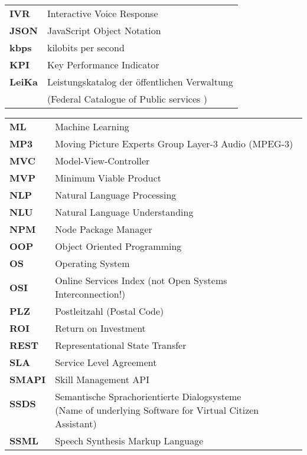 \begin{flushleft}
\begin{tabular}{ll}
\textbf{IVR}	&	Interactive Voice Response\\

\textbf{JSON}	&	JavaScript Object Notation\\

\textbf{kbps}	&	kilobits per second\\

\textbf{KPI}	&	Key Performance Indicator\\

\textbf{LeiKa}	&	Leistungskatalog der öffentlichen Verwaltung \\
& (Federal Catalogue of Public %
services )\\


\end{tabular}
\begin{tabular}{ll}


\textbf{ML}		&	Machine Learning\\
\textbf{MP3}	&	Moving Picture Experts Group Layer-3 Audio (MPEG-3)\\
\textbf{MVC}	&	Model-View-Controller\\
\textbf{MVP}	&	Minimum Viable Product\\



\textbf{NLP}	&	Natural Language Processing\\
\textbf{NLU}	&	Natural Language Understanding\\
\textbf{NPM}	&	Node Package Manager\\

\textbf{OOP}		&	Object Oriented Programming\\
\textbf{OS}		&	Operating System\\
\textbf{OSI}	&	Online Services Index (not Open Systems Interconnection!)\\
\textbf{PLZ}	&	Postleitzahl (Postal Code)\\

\textbf{ROI}	&	Return on Investment\\
\textbf{REST}	&	Representational State Transfer\\
\textbf{SLA}	&	Service Level Agreement\\
\textbf{SMAPI}	&	Skill Management API\\


\shortstack[l]{\textbf{SSDS}\\ \textcolor{white}{x}}	&	\shortstack[l]{Semantische Sprachorientierte Dialogsysteme \\ (Name of underlying Software for Virtual Citizen Assistant)} \\
\textbf{SSML}	&	Speech Synthesis Markup Language\\


\end{tabular}
\end{flushleft}
